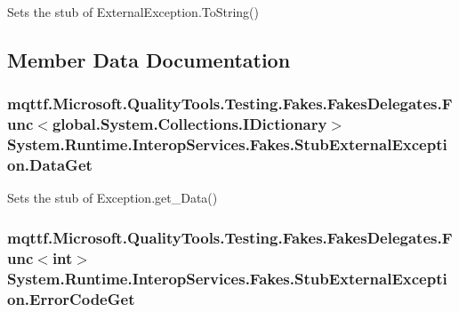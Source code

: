 Sets the stub of External\-Exception.\-To\-String()



\subsection{Member Data Documentation}
\hypertarget{class_system_1_1_runtime_1_1_interop_services_1_1_fakes_1_1_stub_external_exception_a80e13b7fc6b17da68031acddc0b2f9b7}{
\subsubsection[{Data\-Get}]{\setlength{\rightskip}{0pt plus 5cm}mqttf.\-Microsoft.\-Quality\-Tools.\-Testing.\-Fakes.\-Fakes\-Delegates.\-Func$<$global.\-System.\-Collections.\-I\-Dictionary$>$ System.\-Runtime.\-Interop\-Services.\-Fakes.\-Stub\-External\-Exception.\-Data\-Get}}\label{class_system_1_1_runtime_1_1_interop_services_1_1_fakes_1_1_stub_external_exception_a80e13b7fc6b17da68031acddc0b2f9b7}


Sets the stub of Exception.\-get\-\_\-\-Data()

\hypertarget{class_system_1_1_runtime_1_1_interop_services_1_1_fakes_1_1_stub_external_exception_a2b67b3e11d44ca8d09753068ae9131f7}{
\subsubsection[{Error\-Code\-Get}]{\setlength{\rightskip}{0pt plus 5cm}mqttf.\-Microsoft.\-Quality\-Tools.\-Testing.\-Fakes.\-Fakes\-Delegates.\-Func$<$int$>$ System.\-Runtime.\-Interop\-Services.\-Fakes.\-Stub\-External\-Exception.\-Error\-Code\-Get}}\label{class_system_1_1_runtime_1_1_interop_services_1_1_fakes_1_1_stub_external_exception_a2b67b3e11d44ca8d09753068ae9131f7}


